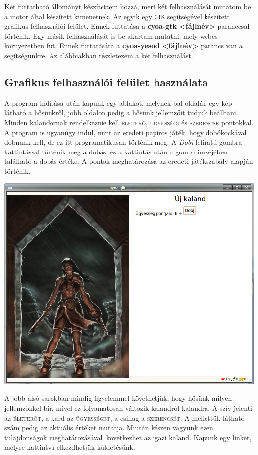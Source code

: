 \documentclass[12pt,a4paper,oneside]{report}
\newcommand{\stat}{\textsc}
\newcommand{\proglang}{\texttt}
\begin{document}
      Két futtatható állományt készítettem hozzá, mert két
      felhasználását mutatom be a motor által készített kimenetnek. Az
      egyik egy \proglang{GTK} segítségével készített grafikus
      felhasználói felület. Ennek futtatása a {\bf cyoa-gtk <fájlnév>}
      paranccsal történik. Egy másik felhasználását is be akartam
      mutatni, mely webes környezetben fut. Ennek futtatására a {\bf
        cyoa-yesod <fájlnév>} parancs van a segítségünkre. Az
      alábbiakban részletezem a két felhasználást.

      \subsection{Graf{}ikus felhasználói felület használata}
        A program indítása után kapunk egy ablakot, melynek bal
        oldalán egy kép látható a hősünkről, jobb oldalon pedig a
        hősünk jellemzőit tudjuk beálltani. Minden kalandornak
        rendelkeznie kell \stat{életerő}, \stat{ügyességi} és
        \stat{szerencse} pontokkal. A program is ugyanúgy indul, mint
        az eredeti papíros játék, hogy dobókockával dobnunk kell, de
        ez itt programatikusan történik meg. A \emph{Dobj} feliratú gombra
        kattintással történik meg a dobás, és a kattintás után a gomb
        címkéjében található a dobás értéke. A pontok meghatározása az
        eredeti játékszabály alapján történik.

        \includegraphics[scale=0.5]{screenshot_001.png}

        A jobb alsó sarokban mindig figyelemmel követhetjük, hogy
        hősünk milyen jellemzőkkel bír, mivel ez folyamatosan változik
        kalandról kalandra. A szív jelenti az \stat{életerőt}, a kard
        az \stat{ügyességet}, a csillag a \stat{szerencsét}. A
        mellettük látható szám pedig az aktuális értéket
        mutatja. Miután készen vagyunk ezen tulajdonságok
        meghatározásával, következhet az igazi kaland. Kapunk egy
        linket, melyre kattintva elkezdhetjük küldetésünk.
\end{document}
